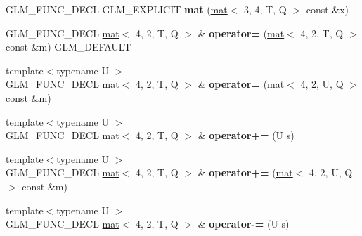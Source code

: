 \begin{DoxyCompactItemize}
G\+L\+M\+\_\+\+F\+U\+N\+C\+\_\+\+D\+E\+CL G\+L\+M\+\_\+\+E\+X\+P\+L\+I\+C\+IT {\bfseries mat} (\hyperlink{structglm_1_1mat}{mat}$<$ 3, 4, T, Q $>$ const \&x)
\item 
\mbox{\label{structglm_1_1mat_3_014_00_012_00_01T_00_01Q_01_4_a00837b7d4eb963a6896f0b58f7457a8a}} 
G\+L\+M\+\_\+\+F\+U\+N\+C\+\_\+\+D\+E\+CL \hyperlink{structglm_1_1mat}{mat}$<$ 4, 2, T, Q $>$ \& {\bfseries operator=} (\hyperlink{structglm_1_1mat}{mat}$<$ 4, 2, T, Q $>$ const \&m) G\+L\+M\+\_\+\+D\+E\+F\+A\+U\+LT
\item 
\mbox{\label{structglm_1_1mat_3_014_00_012_00_01T_00_01Q_01_4_a7599df5e1290d00966fd477872859d1f}} 
{\footnotesize template$<$typename U $>$ }\\G\+L\+M\+\_\+\+F\+U\+N\+C\+\_\+\+D\+E\+CL \hyperlink{structglm_1_1mat}{mat}$<$ 4, 2, T, Q $>$ \& {\bfseries operator=} (\hyperlink{structglm_1_1mat}{mat}$<$ 4, 2, U, Q $>$ const \&m)
\item 
\mbox{\label{structglm_1_1mat_3_014_00_012_00_01T_00_01Q_01_4_ada841f0d997158c603b39e19bea7686c}} 
{\footnotesize template$<$typename U $>$ }\\G\+L\+M\+\_\+\+F\+U\+N\+C\+\_\+\+D\+E\+CL \hyperlink{structglm_1_1mat}{mat}$<$ 4, 2, T, Q $>$ \& {\bfseries operator+=} (U s)
\item 
\mbox{\label{structglm_1_1mat_3_014_00_012_00_01T_00_01Q_01_4_a18b8087339b47fc3f24babd08b729968}} 
{\footnotesize template$<$typename U $>$ }\\G\+L\+M\+\_\+\+F\+U\+N\+C\+\_\+\+D\+E\+CL \hyperlink{structglm_1_1mat}{mat}$<$ 4, 2, T, Q $>$ \& {\bfseries operator+=} (\hyperlink{structglm_1_1mat}{mat}$<$ 4, 2, U, Q $>$ const \&m)
\item 
\mbox{\label{structglm_1_1mat_3_014_00_012_00_01T_00_01Q_01_4_a2154501995309db9c93fb4972f39f17c}} 
{\footnotesize template$<$typename U $>$ }\\G\+L\+M\+\_\+\+F\+U\+N\+C\+\_\+\+D\+E\+CL \hyperlink{structglm_1_1mat}{mat}$<$ 4, 2, T, Q $>$ \& {\bfseries operator-\/=} (U s)
\item 
\mbox{\label{structglm_1_1mat_3_014_00_012_00_01T_00_01Q_01_4_a965c05f65e92e3c87e4a1e36f80c1d82}} 

\end{DoxyCompactItemize}
